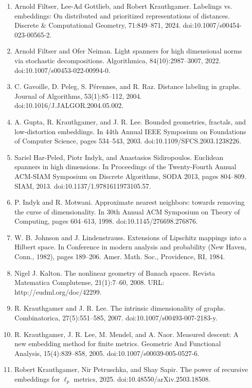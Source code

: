 \begin{enumerate}
\item  [21]  Arnold Filtser, Lee-Ad Gottlieb, and Robert Krauthgamer.  Labelings vs. embeddings: On distributed and prioritized representations of distances.  Discrete \& Computational Geometry, 71:849–871, 2024.  doi:10.1007/s00454-023-00565-2.  
\item  [22]  Arnold Filtser and Ofer Neiman.  Light spanners for high dimensional norms via stochastic decompositions.  Algorithmica, 84(10):2987–3007, 2022.  doi:10.1007/s00453-022-00994-0.  
\item  [23]  C. Gavoille, D. Peleg, S. Pérennes, and R. Raz.  Distance labeling in graphs.  Journal of Algorithms, 53(1):85–112, 2004.  doi:10.1016/J.JALGOR.2004.05.002.  
\item  [24]  A. Gupta, R. Krauthgamer, and J. R. Lee.  Bounded geometries, fractals, and low-distortion embeddings.  In 44th Annual IEEE Symposium on Foundations of Computer Science, pages 534–543, 2003.  doi:10.1109/SFCS.2003.1238226.  
\item  [25]  Sariel Har-Peled, Piotr Indyk, and Anastasios Sidiropoulos.  Euclidean spanners in high dimensions.  In Proceedings of the Twenty-Fourth Annual ACM-SIAM Symposium on Discrete Algorithms, SODA 2013, pages 804–809. SIAM, 2013.  doi:10.1137/1.9781611973105.57.  
\item  [26]  P. Indyk and R. Motwani.  Approximate nearest neighbors: towards removing the curse of dimensionality.  In 30th Annual ACM Symposium on Theory of Computing, pages 604–613, 1998.  doi:10.1145/276698.276876.  
\item  [27]  W. B. Johnson and J. Lindenstrauss.  Extensions of Lipschitz mappings into a Hilbert space.  In Conference in modern analysis and probability (New Haven, Conn., 1982), pages 189–206. Amer. Math. Soc., Providence, RI, 1984.  
\item  [28]  Nigel J. Kalton.  The nonlinear geometry of Banach spaces.  Revista Matematica Complutense, 21(1):7–60, 2008.  URL: http://eudml.org/doc/42299.  
\item  [29]  R. Krauthgamer and J. R. Lee.  The intrinsic dimensionality of graphs.  Combinatorica, 27(5):551–585, 2007.  doi:10.1007/s00493-007-2183-y.  
\item  [30]  R. Krauthgamer, J. R. Lee, M. Mendel, and A. Naor.  Measured descent: A new embedding method for finite metrics.  Geometric And Functional Analysis, 15(4):839–858, 2005.  doi:10.1007/s00039-005-0527-6.  
\item  [31]  Robert Krauthgamer, Nir Petruschka, and Shay Sapir.  The power of recursive embeddings for $\ell_{p}$ metrics, 2025.  doi:10.48550/arXiv.2503.18508.  

\end{enumerate}
